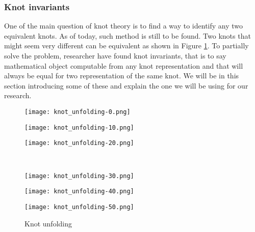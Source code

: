 \documentclass[12pt, a4paper]{article}
\begin{document}
\subsubsection{Knot invariants}

One of the main question of knot theory is to find a way to identify any two equivalent knots. As of today, such method is still to be found. Two knots that might seem very different can be equivalent as shown in Figure \ref{fig:unknot}. To partially solve the problem, researcher have found knot invariants, that is to say mathematical object computable from any knot representation and that will always be equal for two representation of the same knot. We will be in this section introducing some of these and explain the one we will be using for our research.\\

\begin{figure}[H]
  \begin{minipage}[c]{.2\textwidth}
  \centering
  \texttt{[image: knot\_unfolding-0.png]}
    
  \end{minipage}
  \hfill
  \begin{minipage}[c]{.2\textwidth}
  \centering
  \texttt{[image: knot\_unfolding-10.png]}
    
  \end{minipage}
  \hfill
  \begin{minipage}[c]{.2\textwidth}
  \centering
  \texttt{[image: knot\_unfolding-20.png]}
    
  \end{minipage}\\
  \begin{minipage}[c]{.2\textwidth}
  \centering
  \texttt{[image: knot\_unfolding-30.png]}
    
  \end{minipage}
  \hfill
  \begin{minipage}[c]{.2\textwidth}
  \centering
  \texttt{[image: knot\_unfolding-40.png]}
    
  \end{minipage}
  \hfill
  \begin{minipage}[c]{.2\textwidth}
  \centering
  \texttt{[image: knot\_unfolding-50.png]}
    
  \end{minipage}
  \caption{Knot unfolding}
  \label{fig:unknot}
  
\end{figure}
\end{document}
